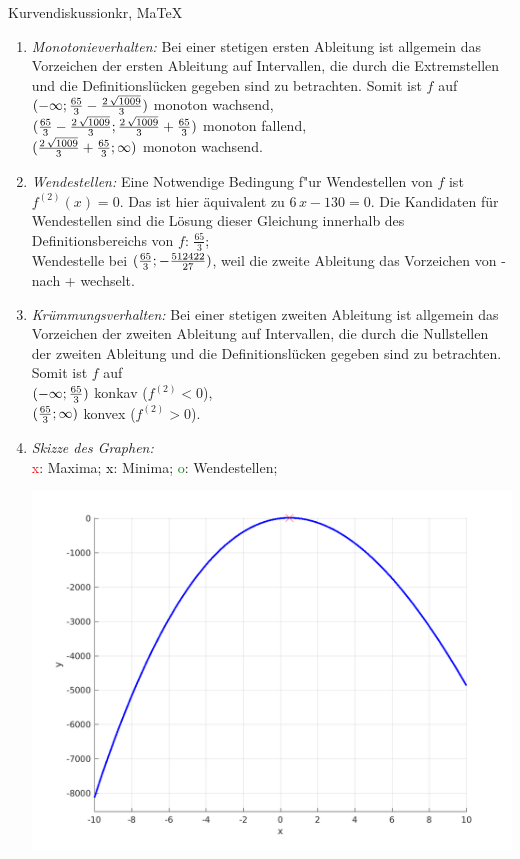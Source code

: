 \begin{MAufgabe}{Kurvendiskussion}{kr, MaTeX}
\begin{enumerate}
 \item \emph{Monotonieverhalten:} 
 Bei einer stetigen ersten Ableitung ist allgemein das Vorzeichen der ersten Ableitung auf Intervallen, die durch die Extremstellen und die Definitionsl\"ucken gegeben sind zu betrachten. Somit ist $f$ auf \\ 
 $(-\infty;\frac{65}{3} - \frac{2\, \sqrt{1009}}{3})$ monoton wachsend, \\ 
 $(\frac{65}{3} - \frac{2\, \sqrt{1009}}{3};\frac{2\, \sqrt{1009}}{3} + \frac{65}{3})$ monoton  fallend, \\ 
 $(\frac{2\, \sqrt{1009}}{3} + \frac{65}{3}; \infty)$ monoton wachsend. \\ 
 \item \emph{Wendestellen:} 
 Eine Notwendige Bedingung f"ur Wendestellen von $f$ ist $f^{(2)}(x)=0$. 
 Das ist hier \"aquivalent zu $6\, x - 130=0$. 
 Die Kandidaten f\"ur Wendestellen sind die L\"osung dieser Gleichung innerhalb des Definitionsbereichs von $f$: $\frac{65}{3}$; \\ 
 Wendestelle bei $(\frac{65}{3};- \frac{512422}{27})$, weil die zweite Ableitung das Vorzeichen von - nach + wechselt. \\ 
 \item \emph{Kr\"ummungsverhalten:} 
 Bei einer stetigen zweiten Ableitung ist allgemein das Vorzeichen der zweiten Ableitung auf Intervallen, die durch die Nullstellen der zweiten Ableitung und die Definitionsl\"ucken gegeben sind zu betrachten. 
 Somit ist $f$ auf \\ 
 $(-\infty ;\frac{65}{3})$  konkav ($f^{(2)}<0$), \\ 
 $(\frac{65}{3}; \infty)$  konvex ($f^{(2)}>0$). \\ 
 \item \emph{Skizze des Graphen:} \\ 
 {\textcolor{red} x}: Maxima; {\textcolor{black} x}: Minima; {\textcolor{green} o}: Wendestellen; 
  \begin{center}
  \includegraphics[width=0.8\linewidth]{Abb_zur_Ag_autogenerated_fractions_25.png} \end{center}
  
 \end{enumerate}
 \else\relax\fi
  \end{MAufgabe}